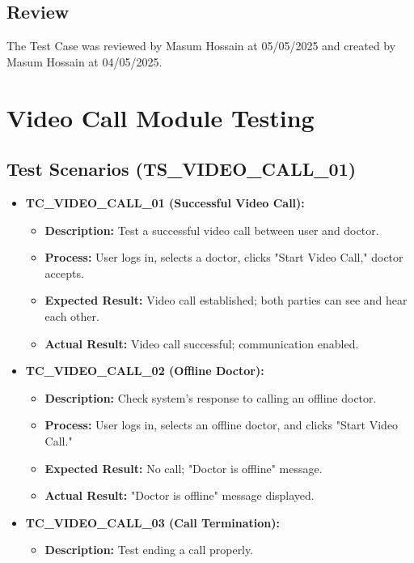 \documentclass{article}
\begin{document}
\subsection{Review}
The Test Case was reviewed by Masum Hossain at 05/05/2025 and created by Masum Hossain at 04/05/2025.

\section{Video Call Module Testing}

\subsection{Test Scenarios (TS\_VIDEO\_CALL\_01)}

\begin{itemize}
    \item \textbf{TC\_VIDEO\_CALL\_01 (Successful Video Call):}
    \begin{itemize}
        \item \textbf{Description:} Test a successful video call between user and doctor.
        \item \textbf{Process:} User logs in, selects a doctor, clicks "Start Video Call," doctor accepts.
        \item \textbf{Expected Result:} Video call established; both parties can see and hear each other.
        \item \textbf{Actual Result:} Video call successful; communication enabled.
    \end{itemize}
    \item \textbf{TC\_VIDEO\_CALL\_02 (Offline Doctor):}
    \begin{itemize}
        \item \textbf{Description:} Check system's response to calling an offline doctor.
        \item \textbf{Process:} User logs in, selects an offline doctor, and clicks "Start Video Call."
        \item \textbf{Expected Result:} No call; "Doctor is offline" message.
        \item \textbf{Actual Result:} "Doctor is offline" message displayed.
    \end{itemize}
    \item \textbf{TC\_VIDEO\_CALL\_03 (Call Termination):}
    \begin{itemize}
        \item \textbf{Description:} Test ending a call properly.

\end{itemize}
\end{itemize}
\end{document}
